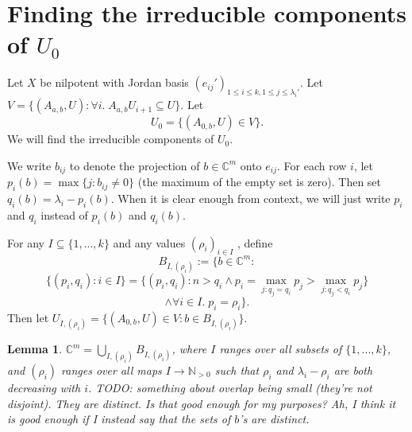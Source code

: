 \documentclass[12pt,psamsfonts]{article}
\newtheorem{lemma}[theorem]{Lemma}
\begin{document}
\section{Finding the irreducible components of \(U_0\)}
Let \(X\) be nilpotent with Jordan basis \((e_{ij}')_{1 \leq i \leq k, 1 \leq j \leq \lambda_i'}\).
Let \(V = \{(A_{a,b}, U) : \forall i. \; A_{a,b} U_{i + 1} \subseteq U\}\).
Let
\[U_0 = \{(A_{0,b}, U) \in V\}.\]
We will find the irreducible components of \(U_0\).
\par We write \(b_{ij}\) to denote the projection of \(b \in \mathbb{C}^m\) onto \(e_{ij}\).
For each row \(i\), let \(p_i(b) = \max\{j : b_{ij} \neq 0\}\) (the maximum of the empty set is zero).
Then set \(q_i(b) = \lambda_i - p_i(b)\).
When it is clear enough from context, we will just write \(p_i\) and \(q_i\) instead of \(p_i(b)\) and \(q_i(b)\).
\par For any \(I \subseteq \{1, ..., k\}\) and any values \((\rho_i)_{i \in I}\) %
, define 
\[B_{I, (\rho_i)} := \{b \in \mathbb{C}^m : \]
\[\{(p_i, q_i) : i \in I\} = \{(p_i, q_i) : n > q_i \land p_i = \max_{j : q_j = q_i} p_j > \max_{j : q_j < q_i} p_j \} \] 
\[\land \forall i \in I. \; p_i = \rho_i \}.\]
Then let \(U_{I, (\rho_i)} = \{(A_{0, b}, U) \in V : b \in B_{I, (\rho_i)}\}\).
\begin{lemma}
    \(\mathbb{C}^m = \bigcup_{I, (\rho_i)} B_{I, (\rho_i)}\), where \(I\) ranges over all subsets of \(\{1, ..., k\}\), and \((\rho_i)\) ranges over all maps \(I \to \mathbb{N}_{>0}\) such that \(\rho_i\) and \(\lambda_i - \rho_i\) are both decreasing with \(i\).
    TODO: something about overlap being small (they're not disjoint).  
    They are distinct.
    Is that good enough for my purposes?
    Ah, I think it is good enough if I instead say that the sets of \(b\)'s are distinct.
\end{lemma}
\end{document}
